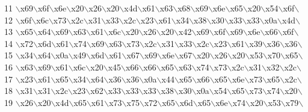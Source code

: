\begin{DoxyCode}
11 \textcolor{stringliteral}{\(\backslash\)x69\(\backslash\)x6f\(\backslash\)x6e\(\backslash\)x20\(\backslash\)x26\(\backslash\)x20\(\backslash\)x4d\(\backslash\)x61\(\backslash\)x63\(\backslash\)x68\(\backslash\)x69\(\backslash\)x6e\(\backslash\)x65\(\backslash\)x20\(\backslash\)x54\(\backslash\)x6f\(\backslash\)}
12 \textcolor{stringliteral}{\(\backslash\)x6f\(\backslash\)x6c\(\backslash\)x73\(\backslash\)x2c\(\backslash\)x31\(\backslash\)x33\(\backslash\)x2c\(\backslash\)x23\(\backslash\)x61\(\backslash\)x34\(\backslash\)x38\(\backslash\)x30\(\backslash\)x33\(\backslash\)x33\(\backslash\)x0a\(\backslash\)x4d\(\backslash\)}
13 \textcolor{stringliteral}{\(\backslash\)x65\(\backslash\)x64\(\backslash\)x69\(\backslash\)x63\(\backslash\)x61\(\backslash\)x6c\(\backslash\)x20\(\backslash\)x26\(\backslash\)x20\(\backslash\)x42\(\backslash\)x69\(\backslash\)x6f\(\backslash\)x69\(\backslash\)x6e\(\backslash\)x66\(\backslash\)x6f\(\backslash\)}
14 \textcolor{stringliteral}{\(\backslash\)x72\(\backslash\)x6d\(\backslash\)x61\(\backslash\)x74\(\backslash\)x69\(\backslash\)x63\(\backslash\)x73\(\backslash\)x2c\(\backslash\)x31\(\backslash\)x33\(\backslash\)x2c\(\backslash\)x23\(\backslash\)x61\(\backslash\)x39\(\backslash\)x36\(\backslash\)x36\(\backslash\)}
15 \textcolor{stringliteral}{\(\backslash\)x34\(\backslash\)x64\(\backslash\)x0a\(\backslash\)x49\(\backslash\)x6d\(\backslash\)x61\(\backslash\)x67\(\backslash\)x69\(\backslash\)x6e\(\backslash\)x67\(\backslash\)x20\(\backslash\)x26\(\backslash\)x20\(\backslash\)x53\(\backslash\)x70\(\backslash\)x65\(\backslash\)}
16 \textcolor{stringliteral}{\(\backslash\)x63\(\backslash\)x69\(\backslash\)x61\(\backslash\)x6c\(\backslash\)x20\(\backslash\)x45\(\backslash\)x66\(\backslash\)x66\(\backslash\)x65\(\backslash\)x63\(\backslash\)x74\(\backslash\)x73\(\backslash\)x2c\(\backslash\)x31\(\backslash\)x32\(\backslash\)x2c\(\backslash\)}
17 \textcolor{stringliteral}{\(\backslash\)x23\(\backslash\)x61\(\backslash\)x65\(\backslash\)x34\(\backslash\)x64\(\backslash\)x36\(\backslash\)x36\(\backslash\)x0a\(\backslash\)x44\(\backslash\)x65\(\backslash\)x66\(\backslash\)x65\(\backslash\)x6e\(\backslash\)x73\(\backslash\)x65\(\backslash\)x2c\(\backslash\)}
18 \textcolor{stringliteral}{\(\backslash\)x31\(\backslash\)x31\(\backslash\)x2c\(\backslash\)x23\(\backslash\)x62\(\backslash\)x33\(\backslash\)x33\(\backslash\)x33\(\backslash\)x38\(\backslash\)x30\(\backslash\)x0a\(\backslash\)x54\(\backslash\)x65\(\backslash\)x73\(\backslash\)x74\(\backslash\)x20\(\backslash\)}
19 \textcolor{stringliteral}{\(\backslash\)x26\(\backslash\)x20\(\backslash\)x4d\(\backslash\)x65\(\backslash\)x61\(\backslash\)x73\(\backslash\)x75\(\backslash\)x72\(\backslash\)x65\(\backslash\)x6d\(\backslash\)x65\(\backslash\)x6e\(\backslash\)x74\(\backslash\)x20\(\backslash\)x53\(\backslash\)x79\(\backslash\)}

\end{DoxyCode}
